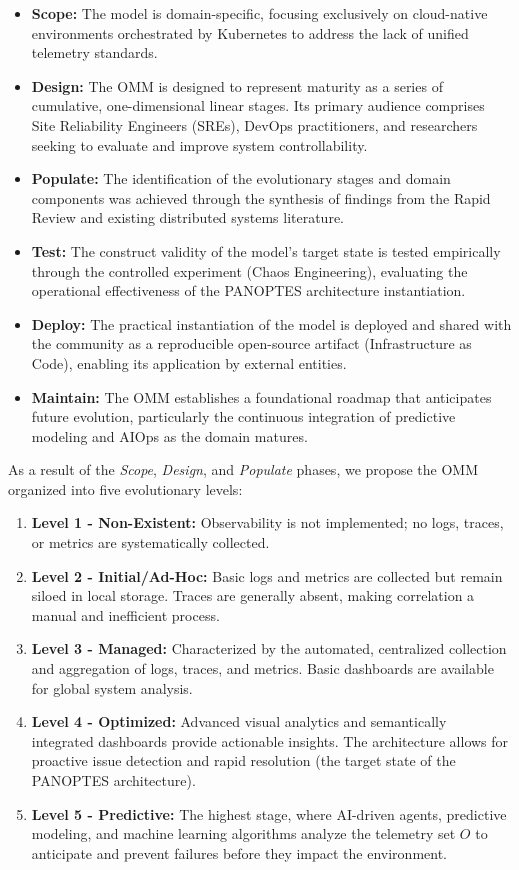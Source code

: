 \begin{itemize}
    \item \textbf{Scope:} The model is domain-specific, focusing exclusively on cloud-native environments orchestrated by Kubernetes to address the lack of unified telemetry standards.
    \item \textbf{Design:} The OMM is designed to represent maturity as a series of cumulative, one-dimensional linear stages. Its primary audience comprises Site Reliability Engineers (SREs), DevOps practitioners, and researchers seeking to evaluate and improve system controllability.
    \item \textbf{Populate:} The identification of the evolutionary stages and domain components was achieved through the synthesis of findings from the Rapid Review and existing distributed systems literature.
    \item \textbf{Test:} The construct validity of the model's target state is tested empirically through the controlled experiment (Chaos Engineering), evaluating the operational effectiveness of the PANOPTES architecture instantiation.
    \item \textbf{Deploy:} The practical instantiation of the model is deployed and shared with the community as a reproducible open-source artifact (Infrastructure as Code), enabling its application by external entities.
    \item \textbf{Maintain:} The OMM establishes a foundational roadmap that anticipates future evolution, particularly the continuous integration of predictive modeling and AIOps as the domain matures.
\end{itemize}

As a result of the \textit{Scope}, \textit{Design}, and \textit{Populate} phases, we propose the OMM organized into five evolutionary levels:

\begin{enumerate}
    \item \textbf{Level 1 - Non-Existent:} Observability is not implemented; no logs, traces, or metrics are systematically collected.
    \item \textbf{Level 2 - Initial/Ad-Hoc:} Basic logs and metrics are collected but remain siloed in local storage. Traces are generally absent, making correlation a manual and inefficient process.
    \item \textbf{Level 3 - Managed:} Characterized by the automated, centralized collection and aggregation of logs, traces, and metrics. Basic dashboards are available for global system analysis.
    \item \textbf{Level 4 - Optimized:} Advanced visual analytics and semantically integrated dashboards provide actionable insights. The architecture allows for proactive issue detection and rapid resolution (the target state of the PANOPTES architecture).
    \item \textbf{Level 5 - Predictive:} The highest stage, where AI-driven agents, predictive modeling, and machine learning algorithms analyze the telemetry set $O$ to anticipate and prevent failures before they impact the environment.
\end{enumerate}

